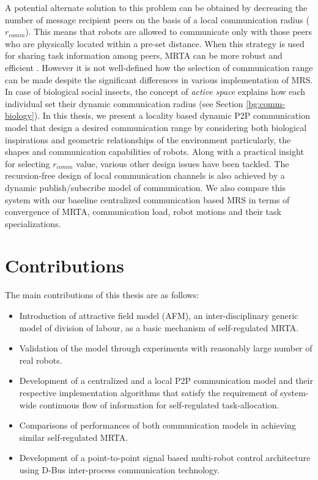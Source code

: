 %
A potential alternate solution to this problem can be obtained by decreasing the number of message recipient peers on the basis of a local communication radius ($r_{comm}$). This means that robots are allowed to communicate only with those peers who are physically located within a pre-set distance. When this strategy is used for sharing task information among peers, MRTA can be more robust and efficient \cite{Agassounon+2004}. However it is not well-defined how the selection of communication range can be made despite the significant differences in various implementation of MRS. In case of biological social insects, the concept of {\em active space} explains how each individual set their dynamic communication radius \cite{Holldobler1990,Mcgregor2000} (see Section \ref{bg:comm-biology}). In this thesis, we present a  locality based dynamic P2P communication model that design a desired communication range by considering both biological inspirations and geometric relationships of the environment particularly, the shapes and communication capabilities of robots. Along with a practical insight for selecting $r_{comm}$ value, various other design issues have been tackled. The recursion-free design of local communication channels is also achieved by a dynamic publish/subscribe model of communication. We also compare this system with our baseline centralized communication based MRS in terms of convergence of MRTA, communication load, robot motions and their task specializations.
\section{Contributions}
The main contributions of this thesis are as follows:
\begin{itemize}
\item Introduction of attractive field model (AFM), an  inter-disciplinary generic model of division of labour, as a basic mechanism of  self-regulated MRTA.
\item Validation of the model through experiments with reasonably large number of real robots.
\item Development of a centralized and a local P2P communication model and their respective implementation algorithms that satisfy the requirement of system-wide continuous flow of information for self-regulated task-allocation.
\item Comparisons of performances of both communication models in achieving similar self-regulated MRTA.
\item Development of a point-to-point signal based multi-robot control architecture using D-Bus inter-process communication technology.
\end{itemize}

